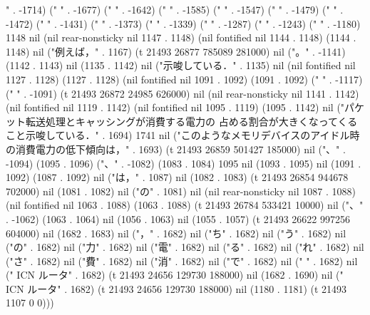 " . -1714) ("
" . -1677) ("
" . -1642) ("
" . -1585) ("
" . -1547) ("
" . -1479) ("
" . -1472) ("
" . -1431) ("
" . -1373) ("
" . -1339) ("
" . -1287) ("
" . -1243) ("
" . -1180) 1148 nil (nil rear-nonsticky nil 1147 . 1148) (nil fontified nil 1144 . 1148) (1144 . 1148) nil ("例えば，" . 1167) (t 21493 26877 785089 281000) nil ("。" . -1141) (1142 . 1143) nil (1135 . 1142) nil ("示唆している．" . 1135) nil (nil fontified nil 1127 . 1128) (1127 . 1128) (nil fontified nil 1091 . 1092) (1091 . 1092) ("
" . -1117) ("
" . -1091) (t 21493 26872 24985 626000) nil (nil rear-nonsticky nil 1141 . 1142) (nil fontified nil 1119 . 1142) (nil fontified nil 1095 . 1119) (1095 . 1142) nil ("パケット転送処理とキャッシングが消費する電力の
占める割合が大きくなってくること示唆している．" . 1694) 1741 nil ("このようなメモリデバイスのアイドル時の消費電力の低下傾向は，" . 1693) (t 21493 26859 501427 185000) nil ("、" . -1094) (1095 . 1096) ("、" . -1082) (1083 . 1084) 1095 nil (1093 . 1095) nil (1091 . 1092) (1087 . 1092) nil ("は，" . 1087) nil (1082 . 1083) (t 21493 26854 944678 702000) nil (1081 . 1082) nil ("の" . 1081) nil (nil rear-nonsticky nil 1087 . 1088) (nil fontified nil 1063 . 1088) (1063 . 1088) (t 21493 26784 533421 10000) nil ("、" . -1062) (1063 . 1064) nil (1056 . 1063) nil (1055 . 1057) (t 21493 26622 997256 604000) nil (1682 . 1683) nil ("，" . 1682) nil ("ち" . 1682) nil ("う" . 1682) nil ("の" . 1682) nil ("力" . 1682) nil ("電" . 1682) nil ("る" . 1682) nil ("れ" . 1682) nil ("さ" . 1682) nil ("費" . 1682) nil ("消" . 1682) nil ("で" . 1682) nil ("
" . 1682) nil (" ICN ルータ" . 1682) (t 21493 24656 129730 188000) nil (1682 . 1690) nil (" ICN ルータ" . 1682) (t 21493 24656 129730 188000) nil (1180 . 1181) (t 21493 1107 0 0)))
